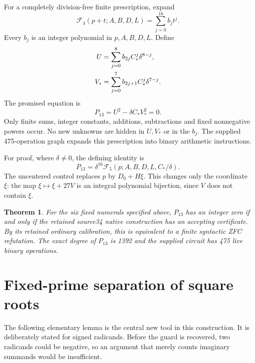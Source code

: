 \documentclass[11pt]{article}
\newtheorem{theorem}{Theorem}[section]
\theoremstyle{remark}\newtheorem{remark}[theorem]{Remark}
\begin{document}
For a completely division-free finite prescription, expand
\[
 \mathcal F_4(p+t;A,B,D,L)=\sum_{j=0}^{16}b_jt^j.
\]
Every $b_j$ is an integer polynomial in $p,A,B,D,L$. Define
\begin{align}
 U&=\sum_{j=0}^{8} b_{2j} C_*^j\delta^{8-j},\notag\\
 V_*&=\sum_{j=0}^{7} b_{2j+1} C_*^j\delta^{7-j}.\label{eq:clear}
\end{align}
The promised equation is
\begin{equation}\label{eq:P13}
 \boxed{\quad P_{13}=U^2-\delta C_*V_*^2=0.\quad}
\end{equation}
Only finite sums, integer constants, additions, subtractions and fixed
nonnegative powers occur. No new unknowns are hidden in $U,V_*$ or in the
$b_j$. The supplied 475-operation graph expands this prescription into
binary arithmetic instructions.

For proof, where $\delta\ne0$, the defining identity is
\begin{equation}\label{eq:normidentity}
 P_{13}=\delta^{16}\mathcal F_5
       (p;A,B,D,L,C_*/\delta).
\end{equation}
The uncentered control replaces $p$ by $D_0+H\xi$.
This changes only the coordinate $\xi$: the map
$\xi\mapsto\xi+27V$ is an integral polynomial bijection, since $V$ does
not contain $\xi$.

\begin{theorem}\label{thm:main}
For the six fixed numerals specified above, $P_{13}$ has an integer zero
if and only if the retained source34 native construction has an accepting
certificate. By its retained ordinary calibration, this is equivalent to a
finite syntactic ZFC refutation. The exact degree of $P_{13}$ is 1392 and
the supplied circuit has 475 live binary operations.
\end{theorem}

\section{Fixed-prime separation of square roots}\label{sec:valuation}
The following elementary lemma is the central new tool in this construction.
It is deliberately stated for signed radicands. Before the guard is
recovered, two radicands could be negative, so an argument that merely counts
imaginary summands would be insufficient.
\end{document}
